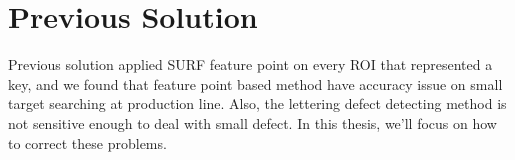\section{Previous Solution}
    Previous solution applied SURF feature point on every ROI that represented a key, and we found that feature point based method have accuracy issue on small target searching at production line.
    Also, the lettering defect detecting method is not sensitive enough to deal with small defect.
    In this thesis, we'll focus on how to correct these problems.